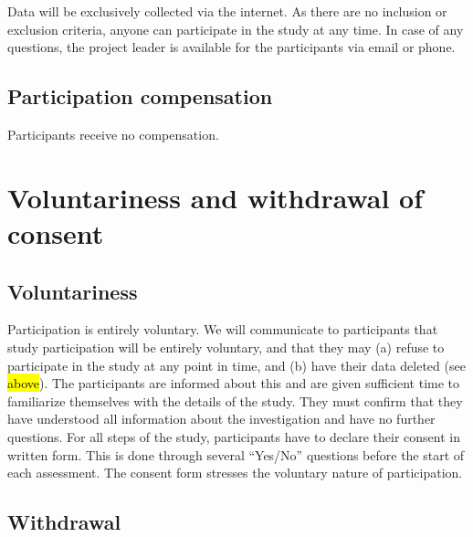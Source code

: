 \documentclass[11pt,twoside,a4paper]{article}
\begin{document}

Data will be exclusively collected via the internet.
As there are no inclusion or exclusion criteria, anyone can participate in the study at any time.
In case of any questions, the project leader is available for the participants via email or phone.

\subsection{Participation compensation}


Participants receive no compensation.

\section{Voluntariness and withdrawal of consent}

\subsection{Voluntariness}


Participation is entirely voluntary.
We will communicate to participants that study participation will be entirely voluntary, and that they may (a) refuse to participate in the study at any point in time, and (b) have their data deleted (see \hl{above}).
The participants are informed about this and are given sufficient time to familiarize themselves with the details of the study.
They must confirm that they have understood all information about the investigation and have no further questions.
For all steps of the study, participants have to declare their consent in written form.
This is done through several ``Yes/No'' questions before the start of each assessment.
The consent form stresses the voluntary nature of participation.

\subsection{Withdrawal}

\end{document}
